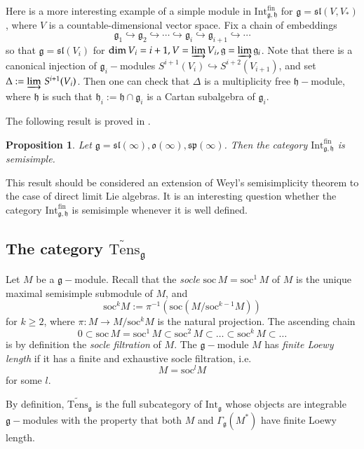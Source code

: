 \documentclass{svmult}
\newtheorem{prop}[theo]{Proposition}
\renewcommand{\sp}{\mathfrak{sp}}
\renewcommand{\sl}{\mathfrak{sl}}
\newcommand{\oo}{\mathfrak{o}}
\newcommand{\hh}{\mathfrak{h}}
\renewcommand{\gg}{\mathfrak{g}}
\newcommand{\Int}{\mathrm{Int}}
\newcommand{\fin}{\mathrm{fin}}
\newcommand{\Soc}{\mathrm{soc}}
\begin{document}
Here is a more interesting example of a simple module in $\Int_{\gg,\hh}^\fin$ for $\gg = \sl(V,V_*)$, where $V$ is a countable-dimensional vector space. Fix a chain of embeddings $$
\gg_1 \hookrightarrow \gg_2 \hookrightarrow \cdots \hookrightarrow \gg_i \hookrightarrow \gg_{i+1} \hookrightarrow \cdots$$ so that $\gg = \sl(V_{i})$ for $\mathrm{dim}\,V_i = i+1, V = \varinjlim V_i, \gg = \varinjlim \gg_i$. Note that there is a canonical injection of $\gg_i-$modules $S^{i+1}(V_{i}) \hookrightarrow S^{i+2}(V_{i+1})$, and set $\Delta:=\varinjlim\,S^{i+1}(V_i)$. Then one can check that $\Delta$ is a multiplicity free $\hh-$module, where $\hh$ is such that $\hh_i := \hh \cap \gg_i$ is a Cartan subalgebra of $\gg_i$.

The following result is proved in \cite{ps}.

\begin{prop}\label{prop_ps} Let  $\gg=\sl(\infty),\oo(\infty),\sp(\infty)$.
Then the category $\mathrm{Int}_{\gg,\hh}^\fin$ is semisimple.  
\end{prop}
This result should be considered an extension of Weyl's semisimplicity theorem to the case of direct limit Lie algebras. It is an interesting question whether the category $\mathrm{Int}_{\gg,\hh}^\fin$ is semisimple whenever it is well defined. 

\subsection{The category $\widetilde{\mathrm{Tens}}_{\gg}$}\label{sect:3.4}
Let $M$ be a $\gg-$module. 
Recall that the \textit{socle} $\Soc\,M = \Soc^1\,M$ of $M$ is the unique maximal semisimple submodule of 
$M$, and $$\mathrm{soc}^kM:=\pi^{-1}(\mathrm{soc}(M/\mathrm{soc}^{k-1}M))$$ for $k \geq 2$, where $\pi : M \rightarrow M/\mathrm{soc}^k M$ is the natural projection. The ascending chain
\begin{equation}\label{eq.filt}
 0 \subset \Soc\,M = \Soc^1\,M \subset \Soc^2\,M\subset \dots\subset\Soc^k\,M\subset\dots\nonumber
\end{equation}
is by definition the \textit{socle filtration} of $M$.
The $\gg-$module $M$ has \textit{finite Loewy length} if it has a finite and exhaustive socle filtration, i.e.
\begin{equation}\label{soc_filt}
 M = \mathrm{soc}^l M \nonumber
\end{equation}
for some $l$. 

By definition, $\widetilde{\mathrm{Tens}}_{\gg}$ is the full subcategory of $\mathrm{Int}_{\gg}$ whose objects are integrable $\gg-$modules with the property that both $M$ and $\Gamma_{\gg}(M^*)$ have finite Loewy length.
\end{document}
